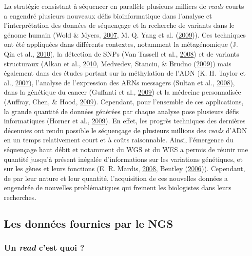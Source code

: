 \documentclass[12pt,twoside]{reedthesis}
\theoremstyle{definition}
\theoremstyle{definition}
\theoremstyle{remark}
\begin{document}
  La stratégie consistant à séquencer en parallèle plusieurs milliers de
  \emph{reads} courts a engendré plusieurs nouveaux défis bioinformatique
  dans l'analyse et l'interprétation des données de séquençage et la
  recherche de variants dans le génome humain (Wold \& Myers,
  \protect\hyperlink{ref-Wold2007}{2007}, M. Q. Yang et al.
  (\protect\hyperlink{ref-Yang2009}{2009})). Ces techniques ont été
  appliquées dans différents contextes, notamment la métagénomique (J. Qin
  et al., \protect\hyperlink{ref-Qin2010}{2010}), la détection de SNPs
  (Van Tassell et al., \protect\hyperlink{ref-VanTassell2008}{2008}) et de
  variants structuraux (Alkan et al.,
  \protect\hyperlink{ref-Alkan2010}{2010}, Medvedev, Stanciu, \& Brudno
  (\protect\hyperlink{ref-Medvedev2009}{2009})) mais également dans des
  études portant sur la méthylation de l'ADN (K. H. Taylor et al.,
  \protect\hyperlink{ref-Taylor2007}{2007}), l'analyse de l'expression des
  ARNs messagers (Sultan et al.,
  \protect\hyperlink{ref-Sultan2008}{2008}), dans la génétique du cancer
  (Guffanti et al., \protect\hyperlink{ref-Guffanti2009}{2009}) et la
  médecine personnalisée (Auffray, Chen, \& Hood,
  \protect\hyperlink{ref-Auffray2009}{2009}). Cependant, pour l'ensemble
  de ces applications, la grande quantité de données générées par chaque
  analyse pose plusieurs défis informatiques (Horner et al.,
  \protect\hyperlink{ref-Horner2009}{2009}). En effet, les progrès
  techniques des dernières décennies ont rendu possible le séquençage de
  plusieurs millions des \emph{reads} d'ADN en un temps relativement court
  et à coûts raisonnable. Ainsi, l'émergence du séquençage haut débit et
  notamment du WGS et du WES a permis de réunir une quantité jusqu'à
  présent inégalée d'informations sur les variations génétiques, et sur
  les gènes et leurs fonctions (E. R. Mardis,
  \protect\hyperlink{ref-Mardis2008}{2008}, Bentley
  (\protect\hyperlink{ref-Bentley2006}{2006})). Cependant, de par leur
  nature et leur quantité, l'acquisition de ces nouvelles données a
  engendrée de nouvelles problématiques qui freinent les biologistes dans
  leurs recherches.
  
  \subsection{Les données fournies par le
  NGS}\label{les-donnees-fournies-par-le-ngs}
  
  \subsubsection{\texorpdfstring{Un \emph{read} c'est quoi
  ?}{Un read c'est quoi ?}}\label{un-read-cest-quoi}
  
\end{document}
